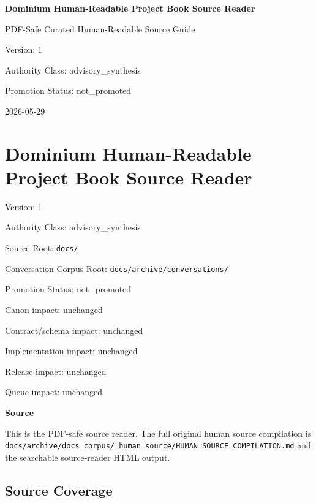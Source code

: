 \documentclass[9pt,a4paper,openany]{book}
\newcommand{\vonecallout}[3]{\par\medskip\noindent\begingroup\setlength{\fboxsep}{7pt}\colorbox{DomCalloutBg}{\parbox{0.94\linewidth}{\textbf{\textcolor{#1}{#2}}\par #3}}\endgroup\par\medskip}
\begin{document}
\frontmatter
\begin{titlepage}
\centering
\vspace*{1.8cm}
{\Huge\bfseries Dominium Human-Readable Project Book Source Reader\par}
\vspace{0.7cm}
{\Large PDF-Safe Curated Human-Readable Source Guide\par}
\vspace{1.1cm}
{\large Version: 1\par}
{\large Authority Class: advisory\_synthesis\par}
{\large Promotion Status: not\_promoted\par}
\vfill
{\large 2026-05-29\par}
\end{titlepage}
\tableofcontents
\mainmatter
\chapter{Dominium Human-Readable Project Book Source Reader}



Version: 1

Authority Class: advisory\_\allowbreak{}synthesis

Source Root: \texttt{docs/\allowbreak{}}

Conversation Corpus Root: \texttt{docs/\allowbreak{}archive/\allowbreak{}conversations/\allowbreak{}}

Promotion Status: not\_\allowbreak{}promoted

Canon impact: unchanged

Contract/\allowbreak{}schema impact: unchanged

Implementation impact: unchanged

Release impact: unchanged

Queue impact: unchanged



\vonecallout{DomSlate}{Source}{This is the PDF-\allowbreak{}safe source reader.\allowbreak{} The full original human source compilation is \texttt{docs/\allowbreak{}archive/\allowbreak{}docs\_\allowbreak{}corpus/\allowbreak{}\_\allowbreak{}human\_\allowbreak{}source/\allowbreak{}HUMAN\_\allowbreak{}SOURCE\_\allowbreak{}COMPILATION.\allowbreak{}md} and the searchable source-\allowbreak{}reader HTML output.\allowbreak{}}



\section{Source Coverage}
\end{document}
